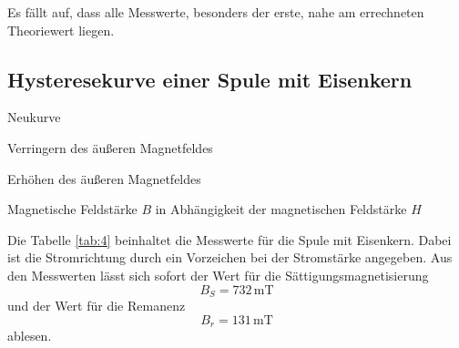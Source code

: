 Es fällt auf, dass alle Messwerte, besonders der erste,
nahe am errechneten Theoriewert liegen.


\subsection{Hysteresekurve einer Spule mit Eisenkern}

  \begin{table}[H]
  \centering
  
    \begin{subtable}{.33\linewidth}
      \centering
      \small
  \caption{Neukurve}
    \end{subtable}%
    \begin{subtable}{.33\linewidth}
      \centering
      \small
  \caption{Verringern des äußeren Magnetfeldes}
    \end{subtable} 
    \begin{subtable}{.33\linewidth}
      \centering
      \small
  \caption{Erhöhen des äußeren Magnetfeldes}
    \end{subtable} 
        \caption{Magnetische Feldstärke $B$ in Abhängigkeit der magnetischen Feldstärke $H$}
    \label{tab:4}
\end{table}

Die Tabelle \ref{tab:4} beinhaltet die Messwerte für
die Spule mit Eisenkern. Dabei ist die Stromrichtung
durch ein Vorzeichen bei der Stromstärke angegeben. Aus
den Messwerten lässt sich sofort der Wert für die
Sättigungsmagnetisierung 
\begin{equation}
  B_S=732\,\si{\milli\tesla}\nonumber
\end{equation}
\noindent und der Wert für die Remanenz
\begin{equation}
  B_r=131\,\si{\milli\tesla}\nonumber
\end{equation}
\noindent ablesen.

